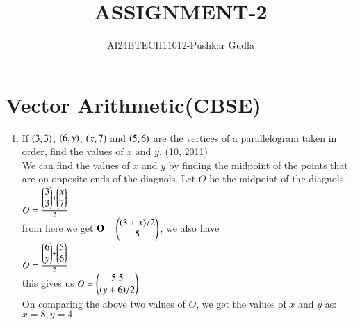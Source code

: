 \documentclass[journal,12pt,twocolumn]{IEEEtran}
\theoremstyle{remark}
\begin{document}

\vspace{3cm}

\title{ASSIGNMENT-2}
\author{AI24BTECH11012-Pushkar Gudla}
\maketitle
\newpage
\bigskip
\section*{\textbf{Vector Arithmetic(CBSE)}}
\begin{enumerate}
	\item If $\left(3,3\right)$, $\left(6,y\right)$, $\left(x,7\right)$ and $\left(5,6\right)$ are the vertices of a parallelogram taken in order, find the values of $x$ and $y$. 
		\hfill{(10, 2011)}\\

		\solution We can find the values of $x$ and $y$ by finding the midpoint of the points that are on opposite ends of the diagnols. Let $O$ be the midpoint of the diagnols.\\

		$O=\frac{\begin{pmatrix}3\\3\end{pmatrix}+\begin{pmatrix}x\\7\end{pmatrix}}{2}$\\
		from here we get $\mathbf{O}=\begin{pmatrix}(3+x)/2 \\ 5\end{pmatrix}$, we also have\\
		$O=\frac{\begin{pmatrix}6\\y\end{pmatrix}+\begin{pmatrix}5\\6\end{pmatrix}}{2}$\\
		this gives us $O=\begin{pmatrix}5.5\\(y+6)/2\end{pmatrix}$\\
		On comparing the above two values of $O$, we get the values of $x$ and $y$ as:\\
		$x=8, y=4$
\end{enumerate}
\end{document}

